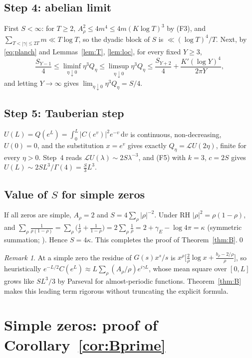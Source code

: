\documentclass[11pt]{amsart}
\theoremstyle{remark}
\newtheorem{remark}[lemma]{Remark}
\theoremstyle{definition}
\newcommand{\gE}{\gamma_E}
\newcommand{\dd}{\,\mathrm{d}}
\begin{document}
\subsection*{Step 4: abelian limit} First $S<\infty$: for $T\ge2$, $A_\rho^2\le4m^4\le4m(K\log T)^3$ by (F3), and $\sum_{T<|\gamma|\le2T}m\ll T\log T$, so the dyadic block of $S$ is $\ll(\log T)^4/T$. Next, by \eqref{eq:planch} and Lemmas~\ref{lem:T}, \ref{lem:loc}, for every fixed $Y\ge3$,
\[
\frac{S_{Y-1}}4\le\liminf_{\eta\downarrow0}\eta^3Q_\eta\le\limsup_{\eta\downarrow0}\eta^3Q_\eta\le\frac{S_{Y+2}}4+\frac{K'(\log Y)^4}{2\pi Y},
\]
and letting $Y\to\infty$ gives $\lim_{\eta\downarrow0}\eta^3Q_\eta=S/4$.

\subsection*{Step 5: Tauberian step} $U(L)=Q(e^L)=\int_0^L|C(e^v)|^2e^{-v}\dd v$ is continuous, non-decreasing, $U(0)=0$, and the substitution $x=e^v$ gives exactly $Q_\eta=\mathcal LU(2\eta)$, finite for every $\eta>0$. Step~4 reads $\mathcal LU(\lambda)\sim2S\lambda^{-3}$, and (F5) with $k=3$, $c=2S$ gives $U(L)\sim2SL^3/\Gamma(4)=\frac S3L^3$.

\subsection*{Value of $S$ for simple zeros} If all zeros are simple, $A_\rho=2$ and $S=4\sum_\rho|\rho|^{-2}$. Under RH $|\rho|^2=\rho(1-\rho)$, and $\sum_\rho\frac1{\rho(1-\rho)}=\sum_\rho\big(\frac1\rho+\frac1{1-\rho}\big)=2\sum_\rho\frac1\rho=2+\gE-\log4\pi=\kappa$ (symmetric summation; \cite[Ch.~12]{Dav00}). Hence $S=4\kappa$. This completes the proof of Theorem~\ref{thm:B}.\qed

\begin{remark}
At a simple zero the residue of $G(s)x^s/s$ is $x^\rho\big[\frac2\rho\log x+\frac{b_\rho-2/\rho}\rho\big]$, so heuristically $e^{-L/2}C(e^L)\approx L\sum_\rho(A_\rho/\rho)e^{i\gamma L}$, whose mean square over $[0,L]$ grows like $SL^3/3$ by Parseval for almost-periodic functions. Theorem~\ref{thm:B} makes this leading term rigorous without truncating the explicit formula.
\end{remark}

\section{Simple zeros: proof of Corollary~\ref{cor:Bprime}}\label{sec:Bprime}
\end{document}
